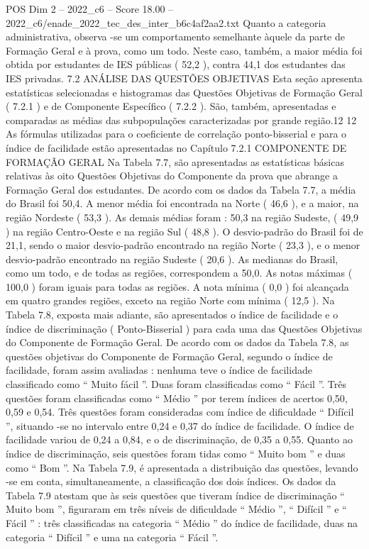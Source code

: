 \begin{textsample}{POS Dim 2 – 2022\_c6 – Score 18.00 – 2022\_c6/enade\_2022\_tec\_des\_inter\_b6c4af2aa2.txt}
Quanto a categoria administrativa, observa -se um comportamento semelhante àquele da parte de Formação Geral e à prova, como um todo.
Neste caso, também, a maior média foi obtida por estudantes de IES públicas ( 52,2 ), contra 44,1 dos estudantes das IES privadas. 7.2 ANÁLISE DAS QUESTÕES OBJETIVAS Esta seção apresenta estatísticas selecionadas e histogramas das Questões Objetivas de Formação Geral ( 7.2.1 ) e de Componente Específico ( 7.2.2 ).
São, também, apresentadas e comparadas as médias das subpopulações caracterizadas por grande região.12 12 As fórmulas utilizadas para o coeficiente de correlação ponto-bisserial e para o índice de facilidade estão apresentadas no Capítulo 7.2.1 COMPONENTE DE FORMAÇÃO GERAL Na Tabela 7.7, são apresentadas as estatísticas básicas relativas às oito Questões Objetivas do Componente da prova que abrange a Formação Geral dos estudantes.
De acordo com os dados da Tabela 7.7, a média do Brasil foi 50,4.
A menor média foi encontrada na Norte ( 46,6 ), e a maior, na região Nordeste ( 53,3 ).
As demais médias foram : 50,3 na região Sudeste, ( 49,9 ) na região Centro-Oeste e na região Sul ( 48,8 ).
O desvio-padrão do Brasil foi de 21,1, sendo o maior desvio-padrão encontrado na região Norte ( 23,3 ), e o menor desvio-padrão encontrado na região Sudeste ( 20,6 ).
As medianas do Brasil, como um todo, e de todas as regiões, correspondem a 50,0.
As notas máximas ( 100,0 ) foram iguais para todas as regiões.
A nota mínima ( 0,0 ) foi alcançada em quatro grandes regiões, exceto na região Norte com mínima ( 12,5 ).
Na Tabela 7.8, exposta mais adiante, são apresentados o índice de facilidade e o índice de discriminação ( Ponto-Bisserial ) para cada uma das Questões Objetivas do Componente de Formação Geral.
De acordo com os dados da Tabela 7.8, as questões objetivas do Componente de Formação Geral, segundo o índice de facilidade, foram assim avaliadas : nenhuma teve o índice de facilidade classificado como “ Muito fácil ”.
Duas foram classificadas como “ Fácil ”.
Três questões foram classificadas como “ Médio ” por terem índices de acertos 0,50, 0,59 e 0,54.
Três questões foram consideradas com índice de dificuldade “ Difícil ”, situando -se no intervalo entre 0,24 e 0,37 do índice de facilidade.
O índice de facilidade variou de 0,24 a 0,84, e o de discriminação, de 0,35 a 0,55.
Quanto ao índice de discriminação, seis questões foram tidas como “ Muito bom ” e duas como “ Bom ”.
Na Tabela 7.9, é apresentada a distribuição das questões, levando -se em conta, simultaneamente, a classificação dos dois índices.
Os dados da Tabela 7.9 atestam que às seis questões que tiveram índice de discriminação “ Muito bom ”, figuraram em três níveis de dificuldade “ Médio ”, “ Difícil ” e “ Fácil ” : três classificadas na categoria “ Médio ” do índice de facilidade, duas na categoria “ Difícil ” e uma na categoria “ Fácil ”.

\end{textsample}
